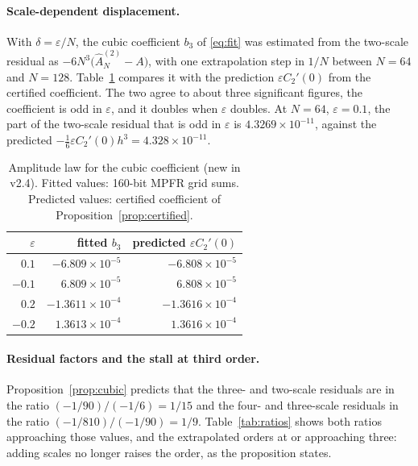 \documentclass[11pt]{article}
\theoremstyle{remark}
\newcommand{\Ahat}{\widehat{A}}
\begin{document}
\paragraph{Scale-dependent displacement.}
With $\delta=\varepsilon/N$, the cubic coefficient $b_3$ of \eqref{eq:fit} was estimated from
the two-scale residual as $-6N^3\bigl(\Ahat^{(2)}_N-A\bigr)$, with one extrapolation step in
$1/N$ between $N=64$ and $N=128$. Table~\ref{tab:b3} compares it with the prediction
$\varepsilon C_2'(0)$ from the certified coefficient. The two agree to about three
significant figures, the coefficient is odd in $\varepsilon$, and it doubles when
$\varepsilon$ doubles. At $N=64$, $\varepsilon=0.1$, the part of the two-scale residual that
is odd in $\varepsilon$ is $4.3269\times10^{-11}$, against the predicted
$-\tfrac16\varepsilon C_2'(0)h^3=4.328\times10^{-11}$.

\begin{table}[ht]
\centering
\begin{tabular}{rrr}
\toprule
$\varepsilon$ & fitted $b_3$ & predicted $\varepsilon C_2'(0)$\\
\midrule
$0.1$ & $-6.809\times10^{-5}$ & $-6.808\times10^{-5}$\\
$-0.1$ & $6.809\times10^{-5}$ & $6.808\times10^{-5}$\\
$0.2$ & $-1.3611\times10^{-4}$ & $-1.3616\times10^{-4}$\\
$-0.2$ & $1.3613\times10^{-4}$ & $1.3616\times10^{-4}$\\
\bottomrule
\end{tabular}
\caption{Amplitude law for the cubic coefficient (new in v2.4). Fitted values: 160-bit MPFR
grid sums. Predicted values: certified coefficient of Proposition~\ref{prop:certified}.}
\label{tab:b3}
\end{table}

\paragraph{Residual factors and the stall at third order.}
Proposition~\ref{prop:cubic} predicts that the three- and two-scale residuals are in the
ratio $(-1/90)/(-1/6)=1/15$ and the four- and three-scale residuals in the ratio
$(-1/810)/(-1/90)=1/9$. Table~\ref{tab:ratios} shows both ratios approaching those values,
and the extrapolated orders at or approaching three: adding scales no longer raises the
order, as the proposition states.
\end{document}
